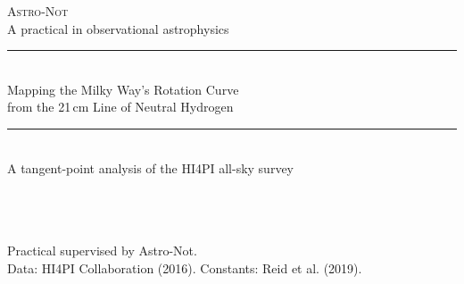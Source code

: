\documentclass[11pt,a4paper]{article}
\begin{document}
\begin{titlepage}
\centering
\vspace*{2cm}

{\scshape\large Astro-Not}\\[0.3cm]
{\small A practical in observational astrophysics}\\[1.2cm]

\rule{\textwidth}{0.6pt}\\[0.6cm]
{\LARGE Mapping the Milky Way's Rotation Curve\\[0.3cm]
from the 21\,cm Line of Neutral Hydrogen}\\[0.6cm]
\rule{\textwidth}{0.6pt}\\[0.8cm]

{\large A tangent-point analysis of the HI4PI all-sky survey}\\[2cm]

{\large {}}\\[0.3cm]
{}\\[0.3cm]
{\small {}}\\[2cm]

{}

\vfill
{\small Practical supervised by Astro-Not.\\
Data: HI4PI Collaboration (2016). Constants: Reid et al. (2019).}
\end{titlepage}
\setcounter{page}{2}   %

\begin{abstract}
\noindent
The circular-speed curve of the inner Milky Way is measured from the 21\,cm
line of neutral hydrogen by the tangent-point method. Spectra were taken
from the HI4PI all-sky survey, averaged over the latitude strip
$|b| \le 0.5\degr$ and binned to  in Galactic longitude over the range
$\,\le l \le\,$. Terminal velocities were
extracted with a fixed brightness threshold $\Tthr = \ph{value}$\,K and
converted to circular speeds at $R = \Rzero|\sin l|$, adopting
$\Rzero = 8.15$\,\kpc\ and $\Tzero = 236$\,\kms. The measured curve
, and the
enclosed dynamical mass within the solar circle follows as
$M(<\Rzero) = \ph{value}\times 10^{11}\,\Msun$ under a spherical
approximation. The largest single uncertainty is the definition of the
velocity edge, which is estimated here at \,\kms; the vanishing
of the terminal velocity as $l \to 90\degr$ is used to test for a residual
systematic offset. 
\end{abstract}
\end{document}
